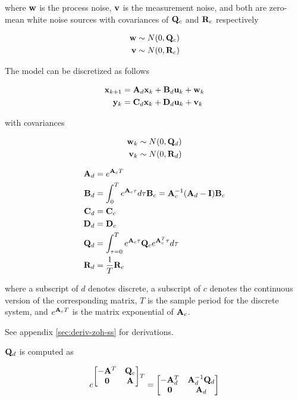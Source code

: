 where $\mathbf{w}$ is the process noise, $\mathbf{v}$ is the measurement noise, and
both are zero-mean white noise sources with covariances of $\mathbf{Q}_c$ and
$\mathbf{R}_c$ respectively

\begin{align*}
  \mathbf{w} &\sim N(0, \mathbf{Q}_c) \\
  \mathbf{v} &\sim N(0, \mathbf{R}_c)
\end{align*}

The model can be discretized as follows

\begin{align*}
  \mathbf{x}_{k+1} &= \mathbf{A}_d \mathbf{x}_k + \mathbf{B}_d \mathbf{u}_k + \mathbf{w}_k \\
   \mathbf{y}_k &= \mathbf{C}_d \mathbf{x}_k + \mathbf{D}_d \mathbf{u}_k + \mathbf{v}_k
\end{align*}

with covariances

\begin{align*}
  \mathbf{w}_k &\sim N(0, \mathbf{Q}_d) \\
  \mathbf{v}_k &\sim N(0, \mathbf{R}_d)
\end{align*}

\begin{theorem}
  \begin{align}
    \mathbf{A}_d &= e^{\mathbf{A}_c T} \\
    \mathbf{B}_d &= \int_0^T e^{\mathbf{A}_c \tau} d\tau \mathbf{B}_c =
      \mathbf{A}_c^{-1} (\mathbf{A}_d - \mathbf{I}) \mathbf{B}_c \\
    \mathbf{C}_d &= \mathbf{C}_c \\
    \mathbf{D}_d &= \mathbf{D}_c \\
    \mathbf{Q}_d &= \int_{\tau = 0}^{T} e^{\mathbf{A}_c\tau} \mathbf{Q}_c
      e^{\mathbf{A}_c^T\tau} d\tau \\
    \mathbf{R}_d &= \frac{1}{T} \mathbf{R}_c
  \end{align}

  where a subscript of $d$ denotes discrete, a subscript of $c$ denotes the
  continuous version of the corresponding matrix, $T$ is the sample period for
  the discrete system, and $e^{\mathbf{A}_c T}$ is the matrix exponential of
  $\mathbf{A}_c$.
\end{theorem}

See appendix \ref{sec:deriv-zoh-ss} for derivations.

$\mathbf{Q}_d$ is computed as

\begin{equation*}
  e^{
  \begin{bmatrix}
    -\mathbf{A}^T & \mathbf{Q}_c \\
    \mathbf{0} & \mathbf{A}
  \end{bmatrix}T} =
  \begin{bmatrix}
    -\mathbf{A}_d^T & \mathbf{A}_d^{-1} \mathbf{Q}_d \\
    \mathbf{0} & \mathbf{A}_d
  \end{bmatrix}
\end{equation*}

